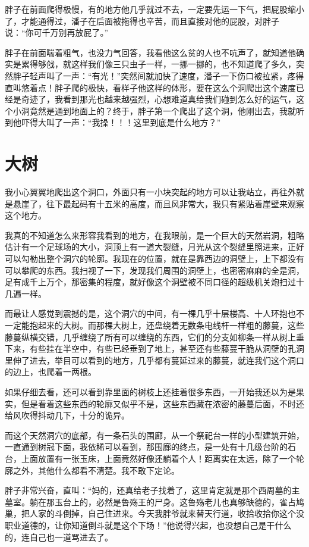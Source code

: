 胖子在前面爬得极慢，有的地方他几乎就过不去，一定要先运一下气，把屁股缩小了，才能通得过，潘子在后面被拖得也辛苦，而且直接对他的屁股，对胖子说：“你可千万别再放屁了。”

胖子在前面喘着粗气，也没力气回答，我看他这么贫的人也不吭声了，就知道他确实是累得够戗，就这样我们像三只虫子一样，一挪一挪的，也不知道爬了多久，突然胖子轻声叫了一声：“有光！”突然间就加快了速度，潘子一下伤口被拉紧，疼得直叫悠着点！胖子爬的极快，看样子他这样的体形，要在这么个洞爬出这个速度已经是奇迹了，我看到那光也越来越强烈，心想难道真给我们碰到怎么好的运气，这个小洞竟然是通到地面上的？终于，胖子第一个爬出了这个洞，他刚出去，我就听到他吓得大叫了一声：“我操！！！这里到底是什么地方？”

\chapter{大树}

我小心翼翼地爬出这个洞口，外面只有一小块突起的地方可以让我站立，再往外就是悬崖了，往下最起码有十五米的高度，而且风非常大，我只有紧贴着崖壁来观察这个地方。

我真的不知道怎么来形容我看到的地方，在我眼前，是一个巨大的天然岩洞，粗略估计有一个足球场的大小，洞顶上有一道大裂缝，月光从这个裂缝里照进来，正好可以勾勒出整个洞穴的轮廓。我现在的位置，就在是靠西边的洞壁上，上下都没有可以攀爬的东西。我扫视了一下，发现我们周围的洞壁上，也密密麻麻的全是洞，足有成千上万个，那密集的程度，就好像这个洞壁被不同口径的超级机关炮扫过十几遍一样。

而最让人感觉到震撼的是，这个洞穴的中间，有一棵几乎十层楼高、十人环抱也不一定能抱起来的大树。而那棵大树上，还盘绕着无数条电线杆一样粗的藤蔓，这些藤蔓纵横交错，几乎缠绕了所有可以缠绕的东西，它们的分支如柳条一样从树上垂下来，有些挂在半空中，有些已经垂到了地上，甚至还有些藤蔓干脆从洞壁的孔洞里伸了进去，举目可以看到的地方，几乎都有蔓延过来的藤蔓，就连我们这个洞口的边上，也爬着一两根。

如果仔细去看，还可以看到靠里面的树枝上还挂着很多东西，一开始我还以为是果实，但是看着这些东西的轮廓又似乎不是，这些东西藏在浓密的藤蔓后面，不时还给风吹得抖动几下，十分的诡异。

而这个天然洞穴的底部，有一条石头的围廊，从一个祭祀台一样的小型建筑开始，一直通到树冠下面，我依稀可以看到，那围廊的终点，是一处有十几级台阶的石台，上面放置有一张玉床，上面竟然好像还躺着个人！距离实在太远，除了一个轮廓之外，其他什么都看不清楚。我不敢下定论。

胖子非常兴奋，直叫：“妈的，还真给老子找着了，这里肯定就是那个西周墓的主墓室。躺在那玉台上的，必然是鲁殇王的尸身。这鲁殇老儿也真够缺德的，雀占鸠巢，把人家的斗倒掉，自己住进来。今天我胖爷就来替天行道，收拾收拾你这个没职业道德的，让你知道倒斗就是这个下场！”他说得兴起，也没想自己是干什么的，连自己也一道骂进去了。

